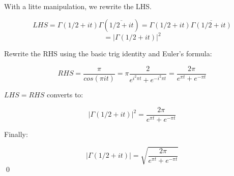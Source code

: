 \documentclass{article}
\begin{document}
With a litte manipulation, we rewrite 
the LHS. 

\[
    LHS = \Gamma(1/2+it)\Gamma(
        \overline{
            1/2+it
        }
    )
    =\Gamma(1/2+it)\overline{
        \Gamma(1/2+it)
    }
\]
\[
    = |\Gamma(1/2+it)|^2
\]

Rewrite the RHS using the basic 
trig identity and Euler's formula:

\[
    RHS = \frac{\pi}
    {cos(\pi it)}
    = \pi 
    \frac{2}{e^{i^2\pi t}+e^{-i^2\pi t}}
    = \frac{2\pi}{e^{\pi t}+e^{-\pi t}}
\]
\newpage

$LHS = RHS$ converts to:

\[
    |\Gamma(1/2+it)|^2 
    =
\frac{2\pi}{e^{\pi t}+e^{-\pi t}}
\]

Finally:

\[
    |\Gamma(1/2+it)|
    =
\sqrt{
    \frac{2\pi}{e^{\pi t}+e^{-\pi t}}
}
\]
\qed
\end{document}

